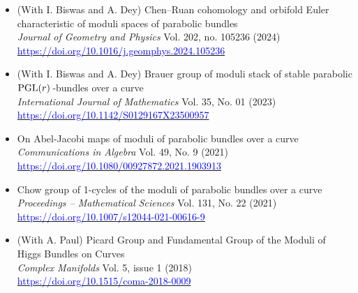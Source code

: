 \documentclass[a4paper,12pt]{article}
\newenvironment{loneinnerlist}[1][\enskip\textbullet]%
{\begin{itemize}[#1,leftmargin=*,parsep=0pt,itemsep=0pt,topsep=0pt,partopsep=0pt]}
	{\end{itemize}\vspace{-.6\baselineskip}}
\begin{document}
\begin{loneinnerlist}[$\bullet$]
		\item (With I. Biswas and A. Dey) Chen--Ruan cohomology and orbifold Euler characteristic of moduli spaces of parabolic bundles\\
		\textit{Journal of Geometry and Physics} Vol. 202, no. 105236 (2024)\\
		\href{https://doi.org/10.1016/j.geomphys.2024.105236}{\textcolor{blue}{https://doi.org/10.1016/j.geomphys.2024.105236}}\\
		\item (With I. Biswas and A. Dey) Brauer group of moduli stack of stable parabolic $\textnormal{PGL}(r)$\,-bundles over a curve\\
		\textit{International Journal of Mathematics}\,\,Vol. 35, No. 01 (2023)\\ \href{https://doi.org/10.1142/S0129167X23500957}{\textcolor{blue}{https://doi.org/10.1142/S0129167X23500957}}\\
		
		\item On Abel-Jacobi maps of moduli of parabolic bundles over a curve \\
		\textit{Communications in Algebra} Vol. 49, No. 9 (2021)\\ \href{https://doi.org/10.1080/00927872.2021.1903913}{\textcolor{blue}{https://doi.org/10.1080/00927872.2021.1903913}}\\
		\item Chow group of 1-cycles of the moduli of parabolic bundles over a curve \\
		\textit{Proceedings -- Mathematical Sciences} Vol. 131, No. 22 (2021)\\
		\href{https://doi.org/10.1007/s12044-021-00616-9}{\textcolor{blue}{https://doi.org/10.1007/s12044-021-00616-9}}\\
		\item (With A. Paul) Picard Group and Fundamental Group of the Moduli of Higgs Bundles on Curves\\
		\textit{Complex Manifolds} Vol. 5, issue 1 (2018)\\ \href{https://doi.org/10.1515/coma-2018-0009}{\textcolor{blue}{https://doi.org/10.1515/coma-2018-0009}}
	\end{loneinnerlist}
	\vspace{10.5ex}
	
\end{document}
